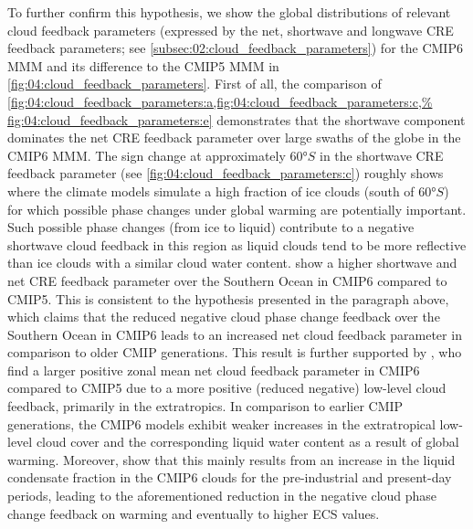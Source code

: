 To further confirm this hypothesis, we show the global distributions of
relevant cloud feedback parameters (expressed by the net, shortwave and
longwave \ac{CRE} feedback parameters; see
\cref{subsec:02:cloud_feedback_parameters}) for the \acs{CMIP}6 \ac{MMM} and
its difference to the \acs{CMIP}5 \ac{MMM} in
\cref{fig:04:cloud_feedback_parameters}. First of all, the comparison of
\cref{fig:04:cloud_feedback_parameters:a,fig:04:cloud_feedback_parameters:c,%
  fig:04:cloud_feedback_parameters:e} demonstrates that the shortwave component
dominates the net \ac{CRE} feedback parameter over large swaths of the globe
in the \acs{CMIP}6 \ac{MMM}. The sign change at approximately $60
\unit{\degree S}$ in the shortwave \ac{CRE} feedback parameter (see
\cref{fig:04:cloud_feedback_parameters:c}) roughly shows where the climate
models simulate a high fraction of ice clouds (south of $60 \unit{\degree
  S}$) for which possible phase changes under global warming are potentially
important. Such possible phase changes (from ice to liquid) contribute to a
negative shortwave cloud feedback in this region as liquid clouds tend to be
more reflective than ice clouds with a similar cloud water content.
show a higher shortwave and net \ac{CRE} feedback parameter over the Southern
Ocean in \acs{CMIP}6 compared to \acs{CMIP}5. This is consistent to the
hypothesis presented in the paragraph above, which claims that the reduced
negative cloud phase change feedback over the Southern Ocean in \acs{CMIP}6
leads to an increased net cloud feedback parameter in comparison to older
\ac{CMIP} generations. This result is further supported by
\textcite{Zelinka2020}, who find a larger positive zonal mean net cloud
feedback parameter in \acs{CMIP}6 compared to \acs{CMIP}5 due to a more
positive (reduced negative) low-level cloud feedback, primarily in the
extratropics. In comparison to earlier \acs{CMIP} generations, the
\acs{CMIP}6 models exhibit weaker increases in the extratropical low-level
cloud cover and the corresponding liquid water content as a result of global
warming. Moreover, \textcite{Zelinka2020} show that this mainly results from
an increase in the liquid condensate fraction in the \acs{CMIP}6 clouds for
the pre-industrial and present-day periods, leading to the aforementioned
reduction in the negative cloud phase change feedback on warming and
eventually to higher \ac{ECS} values.
